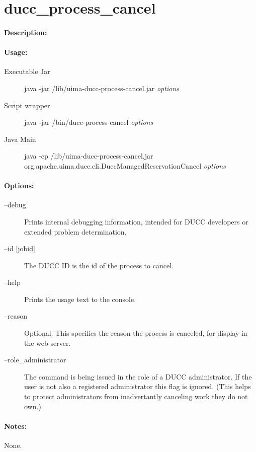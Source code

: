 \ifpdf
\else
{}
\fi
    \section{ducc\_process\_cancel}

    \paragraph{Description:}

    \paragraph{Usage:}
    \begin{description}
    \item[Executable Jar] java -jar \ducchome/lib/uima-ducc-process-cancel.jar {\em options}
    \item[Script wrapper] java -jar \ducchome/bin/ducc-process-cancel {\em options}
    \item[Java Main]      java -cp \ducchome/lib/uima-ducc-process-cancel.jar org.apache.uima.ducc.cli.DuccManagedReservationCancel {\em options}
    \end{description}

    \paragraph{Options:}
    \begin{description}
        \item[--debug ]          
          Prints internal debugging information, intended for DUCC developers or extended problem determination.          
        \item[--id {[jobid]}]
          The DUCC ID is the id of the process to cancel.
        \item[--help]
          Prints the usage text to the console.
        \item[--reason]
          Optional. This specifies the reason the process is canceled, for display in the web server. 
        \item[--role\_administrator] The command is being issued in the role of a DUCC administrator.
          If the user is not also a registered administrator this flag is ignored.  (This helps to
          protect administrators from inadvertantly canceling work they do not own.)
     \end{description}
        
    \paragraph{Notes:}
    None.

